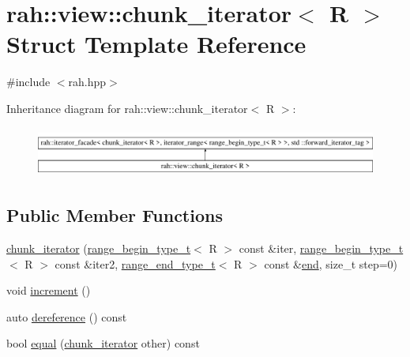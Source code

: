\hypertarget{structrah_1_1view_1_1chunk__iterator}{}\section{rah\+::view\+::chunk\+\_\+iterator$<$ R $>$ Struct Template Reference}
\label{structrah_1_1view_1_1chunk__iterator}


{\ttfamily \#include $<$rah.\+hpp$>$}

Inheritance diagram for rah\+::view\+::chunk\+\_\+iterator$<$ R $>$\+:\begin{figure}[H]
\begin{center}
\leavevmode
\includegraphics[height=1.656805cm]{structrah_1_1view_1_1chunk__iterator}
\end{center}
\end{figure}
\subsection*{Public Member Functions}
\begin{DoxyCompactItemize}
\item 
\mbox{\hyperlink{structrah_1_1view_1_1chunk__iterator_a2675282334475c594c96fdcc6c646895}{chunk\+\_\+iterator}} (\mbox{\hyperlink{namespacerah_a28aff4eeddcece6be65ff0b956d32d4a}{range\+\_\+begin\+\_\+type\+\_\+t}}$<$ R $>$ const \&iter, \mbox{\hyperlink{namespacerah_a28aff4eeddcece6be65ff0b956d32d4a}{range\+\_\+begin\+\_\+type\+\_\+t}}$<$ R $>$ const \&iter2, \mbox{\hyperlink{namespacerah_a9657e24ae477f4482225b133fe286b65}{range\+\_\+end\+\_\+type\+\_\+t}}$<$ R $>$ const \&\mbox{\hyperlink{namespacerah_ac309d041d5f4110ecf2d1b44f4282275}{end}}, size\+\_\+t step=0)
\item 
void \mbox{\hyperlink{structrah_1_1view_1_1chunk__iterator_a5159787ea568a933e219a9218daf3e61}{increment}} ()
\item 
auto \mbox{\hyperlink{structrah_1_1view_1_1chunk__iterator_ad552c568bb914a6107bdcb19a5b9aa88}{dereference}} () const
\item 
bool \mbox{\hyperlink{structrah_1_1view_1_1chunk__iterator_a30a848e24020b169cf18626b2034adaf}{equal}} (\mbox{\hyperlink{structrah_1_1view_1_1chunk__iterator}{chunk\+\_\+iterator}} other) const
\end{DoxyCompactItemize}
